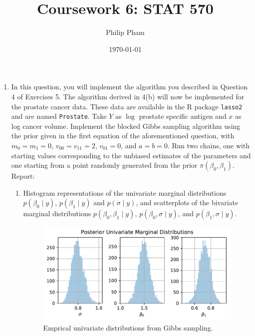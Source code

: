 \documentclass[letterpaper,11pt]{article}
\title{Coursework 6: STAT 570}
\author{Philip Pham}
\date{\today}
\begin{document}
\maketitle
\begin{enumerate}
\item In this question, you will implement the algorithm you described in
  Question 4 of Exercises 5. The algorithm derived in 4(b) will now be
  implemented for the prostate cancer data. These data are available in the R
  package \texttt{lasso2} and are named \texttt{Prostate}. Take $Y$ as $\log$
  prostate specific antigen and $x$ as log cancer volume. Implement the blocked
  Gibbs sampling algorithm using the prior given in the first equation of the
  aforementioned question, with $m_0 = m_1 =0$, $v_{00} = v_{11} = 2$,
  $v_{01} = 0$, and $a=b=0$. Run two chains, one with starting values
  corresponding to the unbiased estimates of the parameters and one starting
  from a point randomly generated from the prior
  $\pi\left(\beta_0, \beta_1\right)$. Report:
  \begin{enumerate}
  \item Histogram representations of the univariate marginal distributions
    $p\left(\beta_0 \mid y\right)$, $p\left(\beta_1 \mid y\right)$ and
    $p\left(\sigma \mid y\right)$, and scatterplots of the bivariate marginal
    distributions $p\left(\beta_0, \beta_1 \mid y\right)$,
    $p\left(\beta_0,\sigma \mid y\right)$, and
    $p\left(\beta_1,\sigma \mid y\right)$.

    \begin{figure}
      \centering
      \includegraphics{p1_univariate_marginals.pdf}
      \caption{Emprical univariate distributions from Gibbs sampling.}
      \label{fig:p1_univariate}
    \end{figure}


\end{enumerate}
\end{enumerate}
\end{document}
